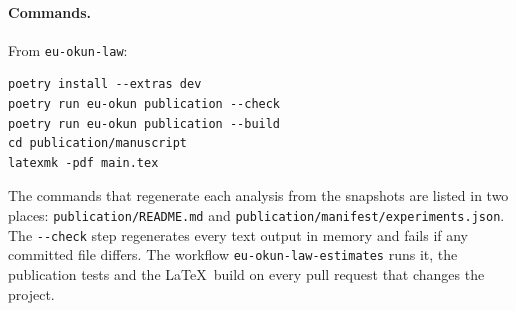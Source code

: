 \paragraph{Commands.} From \texttt{eu-okun-law}:
\begin{verbatim}
poetry install --extras dev
poetry run eu-okun publication --check
poetry run eu-okun publication --build
cd publication/manuscript
latexmk -pdf main.tex
\end{verbatim}
The commands that regenerate each analysis from the snapshots are listed in two places:
\texttt{publication/README.md} and \texttt{publication/manifest/experiments.json}.
The \verb|--check| step regenerates every text output in memory and fails if any
committed file differs. The workflow \texttt{eu-okun-law-estimates} runs it, the
publication tests and the \LaTeX\ build on every pull request that changes the project.


